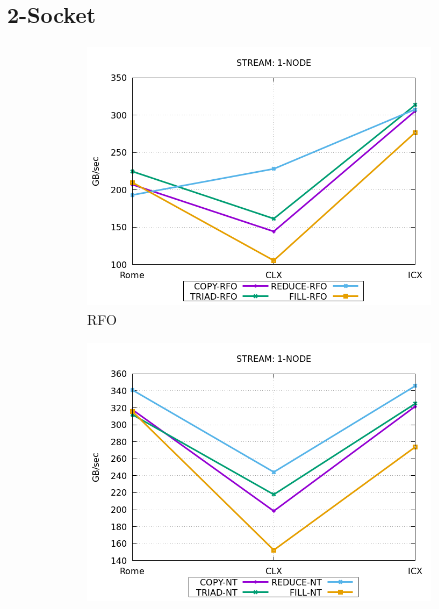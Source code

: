 \documentclass{article}
\begin{document}
\subsection{2-Socket} \label{2-socket}
\begin{figure}[!ht]
    \centering
    \begin{subfigure}[!ht]{0.3\textwidth}
         \centering
         \includegraphics[width=\textwidth]{../mem_bw_node/mb_node_rfo}
         \caption{RFO}
         \label{figure:mem_bw_node_rfo}
    \end{subfigure}
    \begin{subfigure}[!ht]{0.3\textwidth}
         \centering
         \includegraphics[width=\textwidth]{../mem_bw_node/mb_node_nt}

\end{subfigure}
\end{figure}
\end{document}
